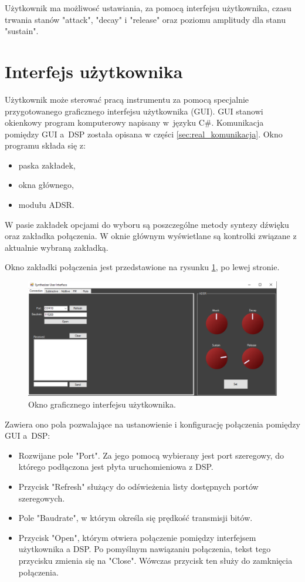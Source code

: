 Użytkownik ma możliwosć ustawiania, za pomocą interfejsu użytkownika, czasu trwania stanów "attack", "decay" i "release" oraz poziomu amplitudy dla stanu "sustain".

\section{Interfejs użytkownika}
Użytkownik może sterować pracą instrumentu za pomocą specjalnie przygotowanego graficznego interfejsu użytkownika (GUI). GUI stanowi okienkowy program komputerowy napisany w~języku C\#. Komunikacja pomiędzy GUI a~DSP została opisana w części \ref{sec:real_komunikacja}. Okno programu składa się z:
\begin{itemize}
	\item paska zakładek,
	\item okna głównego,
	\item modułu ADSR.
\end{itemize}
W pasie zakładek opcjami do wyboru są poszczególne metody syntezy dźwięku oraz zakładka połączenia.
W oknie głównym wyświetlane są kontrolki związane z aktualnie wybraną zakładką. 

Okno zakładki połączenia jest przedstawione na rysunku \ref{rys:real_gui}, po lewej stronie. 
\begin{figure}[H]
	\centering
	\includegraphics[width=16cm]{./grafiki/real_gui}
	\captionsetup{justification=centering}
	\caption{Okno graficznego interfejsu użytkownika.}
	\label{rys:real_gui}
\end{figure}
Zawiera ono pola pozwalające na ustanowienie i konfigurację połączenia pomiędzy GUI a~DSP:
\begin{itemize}
	\item Rozwijane pole "Port". Za jego pomocą wybierany jest port szeregowy, do którego podłączona jest płyta uruchomieniowa z DSP.
	\item Przycisk "Refresh" służący do odświeżenia listy dostępnych portów szeregowych.
	\item Pole "Baudrate", w którym określa się prędkość transmisji bitów. 
	\item Przycisk "Open", którym otwiera połączenie pomiędzy interfejsem użytkownika a DSP. Po pomyślnym nawiązaniu połączenia, tekst tego przycisku zmienia się na "Close". Wówczas przycisk ten służy do zamknięcia połączenia.
\end{itemize} 



